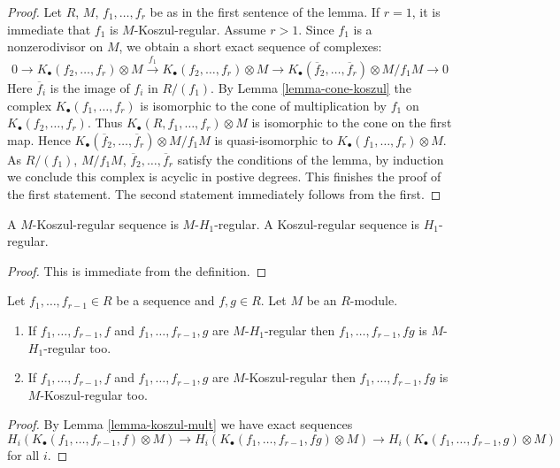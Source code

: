 \begin{proof}
Let $R$, $M$, $f_1, \ldots, f_r$ be as in the first sentence of the lemma.
If $r = 1$, it is immediate that $f_1$ is $M$-Koszul-regular.
Assume $r > 1$. Since $f_1$ is a nonzerodivisor on $M$, we obtain
a short exact sequence of complexes:
$$
0 \to K_\bullet(f_2, \ldots, f_r) \otimes M
\xrightarrow{f_1}
K_\bullet(f_2, \ldots, f_r) \otimes M \to
K_\bullet(\overline{f}_2, \ldots, \overline{f}_r) \otimes M/f_1M \to 0
$$
Here $\overline{f}_i$ is the image of $f_i$ in $R/(f_1)$. By
Lemma \ref{lemma-cone-koszul}
the complex $K_\bullet(f_1, \ldots, f_r)$
is isomorphic to the cone of multiplication by $f_1$
on $K_\bullet(f_2, \ldots, f_r)$. Thus
$K_\bullet(R, f_1, \ldots, f_r) \otimes M$ is isomorphic
to the cone on the first map. Hence
$K_\bullet(\overline{f}_2, \ldots, \overline{f}_r) \otimes M/f_1M$
is quasi-isomorphic to $K_\bullet(f_1, \ldots, f_r) \otimes M$.
As $R/(f_1)$, $M/f_1M$, $\overline{f}_2, \ldots, \overline{f}_r$
satisfy the conditions of the lemma, by induction we conclude
this complex is acyclic in postive degrees. This finishes the proof
of the first statement. The second statement immediately follows
from the first.
\end{proof}

\begin{lemma}
\label{lemma-koszul-regular-H1-regular}
A $M$-Koszul-regular sequence is $M$-$H_1$-regular.
A Koszul-regular sequence is $H_1$-regular.
\end{lemma}

\begin{proof}
This is immediate from the definition.
\end{proof}

\begin{lemma}
\label{lemma-mult-koszul-regular}
Let $f_1, \ldots, f_{r - 1} \in R$ be a sequence and $f, g \in R$.
Let $M$ be an $R$-module.
\begin{enumerate}
\item If $f_1, \ldots, f_{r - 1}, f$ and $f_1, \ldots, f_{r - 1}, g$
are $M$-$H_1$-regular then $f_1, \ldots, f_{r - 1}, fg$ is
$M$-$H_1$-regular too.
\item If $f_1, \ldots, f_{r - 1}, f$ and $f_1, \ldots, f_{r - 1}, g$
are $M$-Koszul-regular then $f_1, \ldots, f_{r - 1}, fg$ is
$M$-Koszul-regular too.
\end{enumerate}
\end{lemma}

\begin{proof}
By
Lemma \ref{lemma-koszul-mult}
we have exact sequences
$$
H_i(K_\bullet(f_1, \ldots, f_{r - 1}, f) \otimes M) \to
H_i(K_\bullet(f_1, \ldots, f_{r - 1}, fg) \otimes M) \to
H_i(K_\bullet(f_1, \ldots, f_{r - 1}, g) \otimes M)
$$
for all $i$.
\end{proof}

